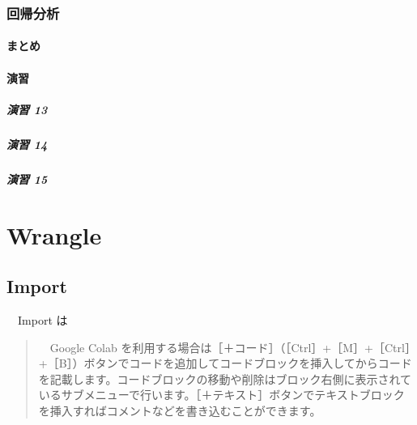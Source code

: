 \documentclass[
  12pt,
]{book}
\begin{document}
\hypertarget{ux56deux5e30ux5206ux6790}{%
\section{回帰分析}\label{ux56deux5e30ux5206ux6790}}

\hypertarget{ux307eux3068ux3081-5}{%
\subsection{まとめ}\label{ux307eux3068ux3081-5}}

\hypertarget{ux6f14ux7fd2-13}{%
\subsection{演習}\label{ux6f14ux7fd2-13}}

\hypertarget{ux6f14ux7fd2-13-1}{%
\subsubsection*{演習 13}\label{ux6f14ux7fd2-13-1}}

\hypertarget{ux6f14ux7fd2-14}{%
\subsubsection*{演習 14}\label{ux6f14ux7fd2-14}}

\hypertarget{ux6f14ux7fd2-15}{%
\subsubsection*{演習 15}\label{ux6f14ux7fd2-15}}

\hypertarget{part-wrangle}{%
\part{Wrangle}\label{part-wrangle}}

\hypertarget{import-1}{%
\chapter{Import}\label{import-1}}

　Import は

\begin{quote}
　Google Colab を利用する場合は［＋コード］（［Ctrl］+［M］+［Ctrl］+［B］）ボタンでコードを追加してコードブロックを挿入してからコードを記載します。コードブロックの移動や削除はブロック右側に表示されているサブメニューで行います。［＋テキスト］ボタンでテキストブロックを挿入すればコメントなどを書き込むことができます。
\end{quote}
\end{document}
